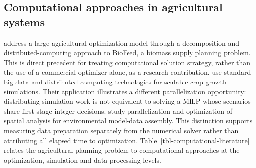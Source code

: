 \documentclass[
  english,
  11pt,
  a4paper,
  authoryear,
  preprint]{elsarticle}
\begin{document}
\subsection{Computational approaches in agricultural
systems}\label{computational-approaches-in-agricultural-systems}

\citet{shastri2011} address a large agricultural optimization model
through a decomposition and distributed-computing approach to BioFeed, a
biomass supply planning problem. This is direct precedent for treating
computational solution strategy, rather than the use of a commercial
optimizer alone, as a research contribution.
\citet{knapen2025} use standard big-data and distributed-computing
technologies for scalable crop-growth simulations. Their application
illustrates a different parallelization opportunity: distributing
simulation work is not equivalent to solving a MILP whose scenarios
share first-stage integer decisions. \citet{zhao2012} study
parallelization and optimization of spatial analysis for environmental
model-data assembly. This distinction supports measuring data
preparation separately from the numerical solver rather than attributing
all elapsed time to optimization.
Table~\ref{tbl-computational-literature} relates the agricultural
planning problem to computational approaches at the optimization,
simulation and data-processing levels.
\end{document}
